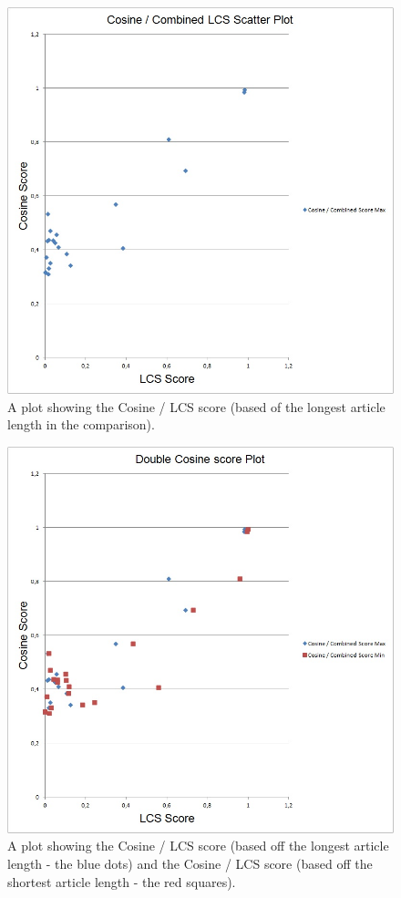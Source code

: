 \begin{figure}
	\centering
	\includegraphics[scale=0.5]{figures/JPPOLCosineLCSMax}
	\caption{A plot showing the Cosine / LCS score (based of the longest article length in the comparison).}
	\label{MaxScore}
\end{figure}

\begin{figure}
	\centering
	\includegraphics[scale=0.5]{figures/JPPOLCosineLCSMin}
	\caption{A plot showing the Cosine / LCS score (based off the longest article length - the blue dots) and the Cosine / LCS score (based off the shortest article length - the red squares).}
		\label{MinScore}
\end{figure}

